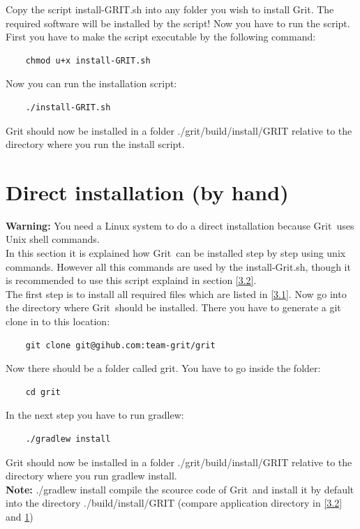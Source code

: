 \documentclass[10pt,a4paper, titlepage, toc=idx]{scrreprt}
\theoremstyle{definition}
\theoremstyle{plain}
\newcommand*{\product}{Grit}
\begin{document}
\noindent Copy the script install-GRIT.sh into any folder you wish to install \product. The required software will be installed by the script! Now you have to run the script.\\

\noindent First you have to make the script executable by the following command:
\begin{lstlisting}
	chmod u+x install-GRIT.sh
\end{lstlisting}
Now you can run the installation script:
\begin{lstlisting}
	./install-GRIT.sh
\end{lstlisting}
\product{} should now be installed in a folder ./grit/build/install/GRIT
relative to the directory where you run the install script.

\section{Direct installation (by hand)}\label{3.3}
\textbf{Warning:} You need a Linux system to do a direct installation because \product\ uses Unix shell commands.\\
In this section it is explained how \product\ can be installed step by step using unix commands. However all this commands are used by the install-Grit.sh, though it is recommended to use this script explaind in section \ref{3.2}.\\

\noindent The first step is to install all required files which are listed in \ref{3.1}. Now go into the directory where \product\ should be installed. There you have to generate a git clone in to this location: 
\begin{lstlisting}
	git clone git@gihub.com:team-grit/grit
\end{lstlisting}

\noindent Now there should be a folder called grit. You have to go inside the folder:
\begin{lstlisting}
	cd grit
\end{lstlisting}

\noindent In the next step you have to run gradlew: 
\begin{lstlisting}
	./gradlew install
\end{lstlisting}
\product{} should now be installed in a folder ./grit/build/install/GRIT
relative to the directory where you run gradlew install.\\

\noindent \textbf{Note:} ./gradlew install compile the scource code of \product\ and install it by default into the directory ./build/install/GRIT (compare application directory in \ref{3.2} and \ref{3.3})
\end{document}
